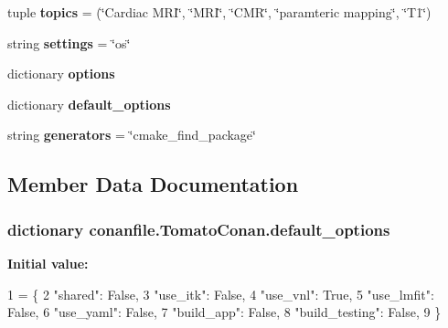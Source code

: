 \begin{DoxyCompactItemize}
\item 
tuple {\bfseries topics} = (\char`\"{}Cardiac M\+RI\char`\"{}, \char`\"{}M\+RI\char`\"{}, \char`\"{}C\+MR\char`\"{}, \char`\"{}paramteric mapping\char`\"{}, \char`\"{}T1\char`\"{})\hypertarget{classconanfile_1_1_tomato_conan_ae313448f5395ee58ba9a85a7ca82c23c}{}\label{classconanfile_1_1_tomato_conan_ae313448f5395ee58ba9a85a7ca82c23c}

\item 
string {\bfseries settings} = \char`\"{}os\char`\"{}\hypertarget{classconanfile_1_1_tomato_conan_a6d2ca4c580877cac66ca1341ca2ca85a}{}\label{classconanfile_1_1_tomato_conan_a6d2ca4c580877cac66ca1341ca2ca85a}

\item 
dictionary {\bfseries options}
\item 
dictionary {\bfseries default\+\_\+options}
\item 
string {\bfseries generators} = \char`\"{}cmake\+\_\+find\+\_\+package\char`\"{}\hypertarget{classconanfile_1_1_tomato_conan_af526159a57c62a54d1b00aa7b6b16e1a}{}\label{classconanfile_1_1_tomato_conan_af526159a57c62a54d1b00aa7b6b16e1a}

\end{DoxyCompactItemize}


\subsection{Member Data Documentation}
\subsubsection[{\texorpdfstring{default\+\_\+options}{default_options}}]{\setlength{\rightskip}{0pt plus 5cm}dictionary conanfile.\+Tomato\+Conan.\+default\+\_\+options\hspace{0.3cm}{\ttfamily [static]}}\hypertarget{classconanfile_1_1_tomato_conan_a29503a3b385bfdc7deb5dc266624b630}{}\label{classconanfile_1_1_tomato_conan_a29503a3b385bfdc7deb5dc266624b630}
{\bfseries Initial value\+:}
\begin{DoxyCode}
1 = \{
2         \textcolor{stringliteral}{"shared"}: \textcolor{keyword}{False},
3         \textcolor{stringliteral}{"use\_itk"}: \textcolor{keyword}{False},
4         \textcolor{stringliteral}{"use\_vnl"}: \textcolor{keyword}{True},
5         \textcolor{stringliteral}{"use\_lmfit"}: \textcolor{keyword}{False},
6         \textcolor{stringliteral}{"use\_yaml"}: \textcolor{keyword}{False},
7         \textcolor{stringliteral}{"build\_app"}: \textcolor{keyword}{False},
8         \textcolor{stringliteral}{"build\_testing"}: \textcolor{keyword}{False},
9     \}
\end{DoxyCode}
